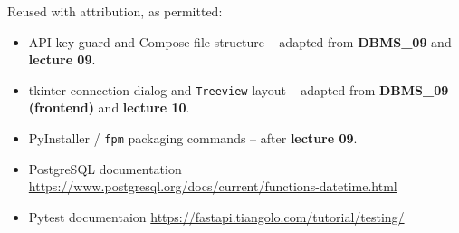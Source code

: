 \documentclass[11pt,a4paper]{article}
\begin{document}
Reused with attribution, as permitted:
\begin{itemize}[leftmargin=1.4em, topsep=2pt]
  \item API-key guard and Compose file structure -- adapted from
        \textbf{DBMS\_09} and \textbf{lecture 09}.
  \item tkinter connection dialog and \texttt{Treeview} layout -- adapted from
        \textbf{DBMS\_09 (frontend)} and \textbf{lecture 10}.
  \item PyInstaller / \texttt{fpm} packaging commands -- after \textbf{lecture
        09}.
  \item PostgreSQL documentation \url{https://www.postgresql.org/docs/current/functions-datetime.html}
  \item Pytest documentaion \url{https://fastapi.tiangolo.com/tutorial/testing/}
\end{itemize}
\end{document}
